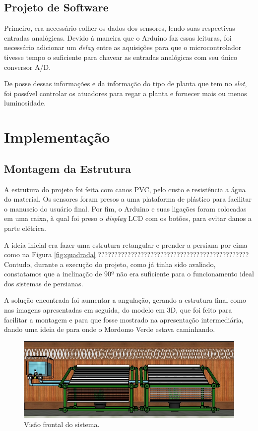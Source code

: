 \documentclass[a4paper,12pt]{report}
\begin{document}
	\section{Projeto de Software}
	Primeiro, era necessário colher os dados dos sensores, lendo suas respectivas entradas analógicas. Devido à maneira que o Arduino faz essas leituras, foi necessário adicionar um \textit{delay} entre as aquisições para que o microcontrolador tivesse tempo o suficiente para chavear as entradas analógicas com seu único conversor A/D.
	
	De posse dessas informações e da informação do tipo de planta que tem no \textit{slot}, foi possível controlar os atuadores para regar a planta e fornecer mais ou menos luminosidade.
	

\cleardoublepage
\chapter{Implementação}
	\label{cap:Implementacao}

\section{Montagem da Estrutura}
	\label{sec:montagem}
	A estrutura do projeto foi feita com canos PVC, pelo custo e resistência a água do material. Os sensores foram presos a uma plataforma de plástico para facilitar o manuseio do usuário final. Por fim, o Arduino e suas ligações foram colocadas em uma caixa, à qual foi preso o \textit{display} LCD com os botões, para evitar danos a parte elétrica.
	
	A ideia inicial era fazer uma estrutura retangular e prender a persiana por cima como na Figura \ref{fig:quadrada} ??????????????????????????????????????????????
	Contudo, durante a execução do projeto, como já tinha sido avaliado, constatamos que a inclinação de 90º não era suficiente para o funcionamento ideal dos sistemas de persianas.
	
	A solução encontrada foi aumentar a angulação, gerando a estrutura final como nas imagens apresentadas em seguida, do modelo em 3D, que foi feito para facilitar a montagem e para que fosse mostrado na apresentação intermediária, dando uma ideia de para onde o Mordomo Verde estava caminhando.
	
	
	
	\begin{figure}[!h]
	\centering
	\includegraphics[width=1.0\linewidth]{figs/estru1}
	\caption{Visão frontal do sistema.}
	\label{fig:estru1}
	\end{figure}
\end{document}
